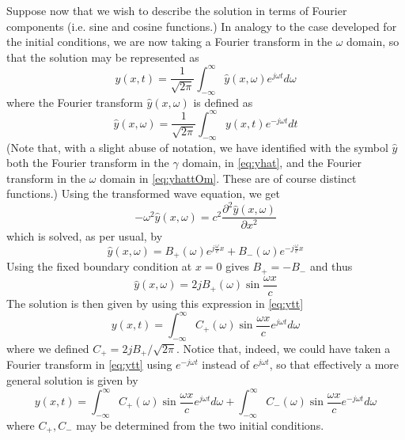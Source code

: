 Suppose now that we wish to describe the solution in terms of Fourier components (i.e. sine and cosine functions.) In analogy to the case developed for the initial conditions, we are now taking a Fourier transform in the $\omega$ domain, so that the solution may be represented as
\begin{equation}\label{eq:ytt}
y(x,t) = \frac{1}{\sqrt{2\pi}} \int_{-\infty}^{\infty} \hat y(x,\omega) e^{j\omega t} d\omega
\end{equation}
where the Fourier transform $\hat y(x,\omega)$ is defined as
\begin{equation}\label{eq:yhattOm}
\hat y(x,\omega) = \frac{1}{\sqrt{2\pi}} \int_{-\infty}^{\infty}  y(x,t) e^{-j\omega t} d t
\end{equation}
(Note that, with a slight abuse of notation, we have identified with the symbol $\hat y$ both the Fourier transform in the $\gamma$ domain, in \eqref{eq:yhat}, and the Fourier transform in the $\omega$ domain in \eqref{eq:yhattOm}. These are of course distinct functions.) Using the transformed wave equation, we get
\begin{equation}
-\omega^2 \hat y(x,\omega) = c^2 \frac{\partial^2 \hat y(x,\omega)}{\partial x^2}
\end{equation}
which is solved, as per usual, by
\begin{equation}\label{eq:bcss}
\hat y(x,\omega) = B_+(\omega) e^{j\frac{\omega}{c}x} + B_-(\omega) e^{-j\frac{\omega}{c}x}
\end{equation}
Using the fixed boundary condition at $x=0$ gives $B_+ = -B_-$ and thus
\begin{equation}\label{eq:FixedFou1}
\hat y(x,\omega) = 2jB_+(\omega) \sin \frac{\omega x}{c} 
\end{equation}
The solution is then given by using this expression in \eqref{eq:ytt}
\begin{equation}
y(x,t)=\int_{-\infty}^{\infty} C_+(\omega) \sin\frac{\omega x}{c} e^{j\omega t} d\omega
\end{equation}
where we defined $C_+ = 2 j B_+/\sqrt{2\pi}$. Notice that, indeed, we could have taken a Fourier transform in \eqref{eq:ytt} using $e^{-j \omega t}$ instead of $e^{j \omega t}$, so that effectively a more general solution is given by
\begin{equation}\label{eq:FixedFou}
y(x,t)=\int_{-\infty}^{\infty} C_+(\omega) \sin\frac{\omega x}{c} e^{j\omega t} d\omega +  \int_{-\infty}^{\infty} C_-(\omega) \sin\frac{\omega x}{c} e^{-j\omega t} d\omega
\end{equation}
where $C_+,C_-$ may be determined from the two initial conditions. 


